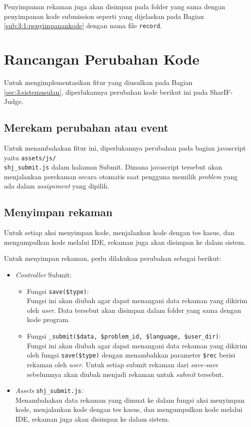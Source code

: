 Penyimpanan rekaman juga akan disimpan pada folder yang sama dengan penyimpanan kode submission seperti yang dijelaskan pada Bagian \ref{sub:3:1:penyimpanankode} dengan nama file \verb|record|.

\section{Rancangan Perubahan Kode}

Untuk mengimplementasikan fitur yang diusulkan pada Bagian \ref{sec:3:sistemusulan}, diperlukannya perubahan kode berikut ini pada SharIF-Judge.


\subsection{Merekam perubahan atau event}
\label{sub:4:3:merekam}

Untuk menambahakan fitur ini, diperlukannya perubahan pada bagian javascript yaitu \verb|assets/js/|\\\verb|shj_submit.js| dalam halaman Submit. Dimana javascript tersebut akan menjalankan perekaman secara otomatis saat pengguna memilih \textit{problem} yang ada dalam \textit{assignment} yang dipilih.

\subsection{Menyimpan rekaman}

Untuk setiap aksi menyimpan kode, menjalankan kode dengan tes kasus, dan mengumpulkan kode melalui IDE, rekaman juga akan disimpan ke dalam sistem.

Untuk menyimpan rekaman, perlu dilakukan perubahan sebagai berikut:

\begin{itemize}
    \item \textit{Controller} Submit:
        \begin{itemize}
            \item Fungsi \verb|save($type)|: \\
            Fungsi ini akan diubah agar dapat menangani data rekaman yang dikirim oleh \textit{user}. Data tersebut akan disimpan dalam folder yang sama dengan kode program.
            \item Fungsi \verb|_submit($data, $problem_id, $language, $user_dir)|: \\
            Fungsi ini akan diubah agar dapat menangani data rekaman yang dikirim oleh fungsi \verb|save($type)| dengan menambahkan parameter \verb|$rec| berisi rekaman oleh \textit{user}. Untuk setiap submit rekaman dari \textit{save-save} sebelumnya akan diubah menjadi rekaman untuk \textit{submit} tersebut.
        \end{itemize}
    \item \textit{Assets} \verb|shj_submit.js|: \\
        Menambahakan data rekaman yang dimuat ke dalam fungsi aksi menyimpan kode, menjalankan kode dengan tes kasus, dan mengumpulkan kode melalui IDE, rekaman juga akan disimpan ke dalam sistem.
\end{itemize}

